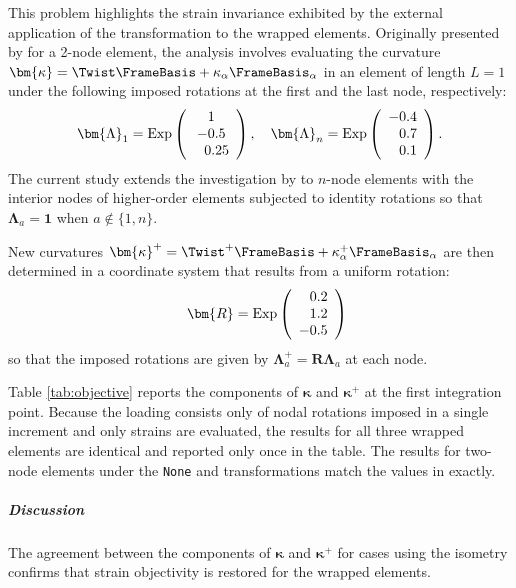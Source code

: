 

This problem highlights the strain invariance %
exhibited by the external application of the \Spherical{} transformation to the wrapped
elements. 
Originally presented by \cite{crisfield1999objectivity} for a 2-node element,
the analysis involves evaluating the curvature
\(\bm{\kappa} = \Twist \FrameBasis + \kappa_\alpha \FrameBasis_\alpha\)
in an element of length \(L = 1\) under
the following imposed rotations at the first and the last node, respectively:
\[
\bm{\Lambda}_1= \operatorname{Exp} \left(\begin{array}{c}
1 \\
-0.5 \\
\hphantom{-}0.25
\end{array}\right),
%
\quad \bm{\Lambda}_n= \operatorname{Exp}\left(\begin{array}{c}
-0.4 \\
\hphantom{-}0.7 \\
\hphantom{-}0.1
\end{array}\right).
\]
The current study extends the investigation by  
\cite{jelenić1999geometrically}
to \(n\)-node elements %
with the interior nodes of higher-order elements subjected to 
identity rotations so that \(\bm{\Lambda}_a = \bm{1}\) when \(a \notin \{1,n\}\).

New curvatures
\(\bm{\kappa}^+ = \Twist^+ \FrameBasis + \kappa_\alpha^+\FrameBasis_\alpha\) are then determined 
in a coordinate system that results from a uniform rotation:
\[
\quad \bm{R} = \operatorname{Exp}\left(\begin{array}{c}
\hphantom{-}0.2 \\
\hphantom{-}1.2 \\
-0.5
\end{array}\right)
\]
so that the imposed rotations are given by \(\bm{\Lambda}_a^+ = \bm{R}\bm{\Lambda}_a\) at each node.

Table \ref{tab:objective} reports the components of \(\bm{\kappa}\) and \(\bm{\kappa}^+\) at the first integration
point.
Because the loading consists only of nodal rotations
imposed in a single increment 
and only strains are evaluated, the results for all three wrapped elements
are identical and reported only once in the table.
The results for two-node elements under the \texttt{None} and \Spherical{} 
transformations match the values %
in \cite{crisfield1999objectivity} exactly.

\begin{center}
\begin{table}[!h]%
\caption{%
Curvature components of Example~\ref{sec:frame-1000} for elements with \(n\) nodes.
All cases using the \Spherical{} isometry
show perfect agreement between \(\bm{\kappa}\) and \(\bm{\kappa}^+\).}
\label{tab:objective}

\end{table}
\end{center}

\subparagraph{Discussion}

The agreement between the components of \(\bm{\kappa}\) and \(\bm{\kappa}^+\)
for cases using the \Spherical{} isometry
confirms that strain objectivity is restored for the wrapped elements.